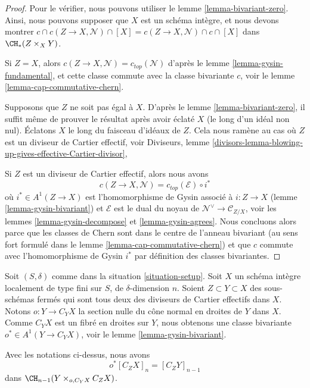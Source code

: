 \begin{proof}
Pour le vérifier, nous pouvons utiliser le lemme \ref{lemma-bivariant-zero}.
Ainsi, nous pouvons supposer que $X$ est un schéma intègre, et nous devons montrer
$c \cap c(Z \to X, \mathcal{N}) \cap [X] =
c(Z \to X, \mathcal{N}) \cap c \cap [X]$ dans $\CH_*(Z \times_X Y)$.

\medskip\noindent
Si $Z = X$, alors $c(Z \to X, \mathcal{N}) = c_{top}(\mathcal{N})$ d'après le
lemme \ref{lemma-gysin-fundamental}, et cette classe commute
avec la classe bivariante $c$, voir le lemme \ref{lemma-cap-commutative-chern}.

\medskip\noindent
Supposons que $Z$ ne soit pas égal à $X$. D'après le lemme \ref{lemma-bivariant-zero},
il suffit même de prouver le résultat après avoir éclaté $X$ (le long d'un idéal non nul).
Éclatons $X$ le long du faisceau d'idéaux de $Z$. Cela nous ramène au cas
où $Z$ est un diviseur de Cartier effectif, voir
Diviseurs, lemme
\ref{divisors-lemma-blowing-up-gives-effective-Cartier-divisor},

\medskip\noindent
Si $Z$ est un diviseur de Cartier effectif, alors nous avons
$$
c(Z \to X, \mathcal{N}) =
c_{top}(\mathcal{E}) \circ i^*
$$
où $i^* \in A^1(Z \to X)$ est l'homomorphisme de Gysin
associé à $i : Z \to X$ (lemme \ref{lemma-gysin-bivariant})
et $\mathcal{E}$ est le dual du noyau de
$\mathcal{N}^\vee \to \mathcal{C}_{Z/X}$, voir les
lemmes \ref{lemma-gysin-decompose} et \ref{lemma-gysin-agrees}.
Nous concluons alors parce que les classes de Chern sont dans le centre de
l'anneau bivariant (au sens fort formulé dans le
lemme \ref{lemma-cap-commutative-chern}) et que $c$ commute
avec l'homomorphisme de Gysin $i^*$ par définition des classes bivariantes.
\end{proof}

\noindent
Soit $(S, \delta)$ comme dans la situation \ref{situation-setup}. Soit $X$ un
schéma intègre localement de type fini sur $S$, de $\delta$-dimension $n$.
Soient $Z \subset Y \subset X$ des sous-schémas fermés qui sont tous deux des
diviseurs de Cartier effectifs dans $X$. Notons $o : Y \to C_Y X$ la section nulle du
cône normal en droites de $Y$ dans $X$. Comme $C_YX$ est un fibré en droites sur $Y$,
nous obtenons une classe bivariante $o^* \in A^1(Y \to C_YX)$, voir le
lemme \ref{lemma-gysin-bivariant}.

\begin{lemma}
\label{lemma-relation-normal-cones}
Avec les notations ci-dessus, nous avons
$$
o^*[C_ZX]_n = [C_Z Y]_{n - 1}
$$
dans $\CH_{n - 1}(Y \times_{o, C_Y X} C_ZX)$.
\end{lemma}

